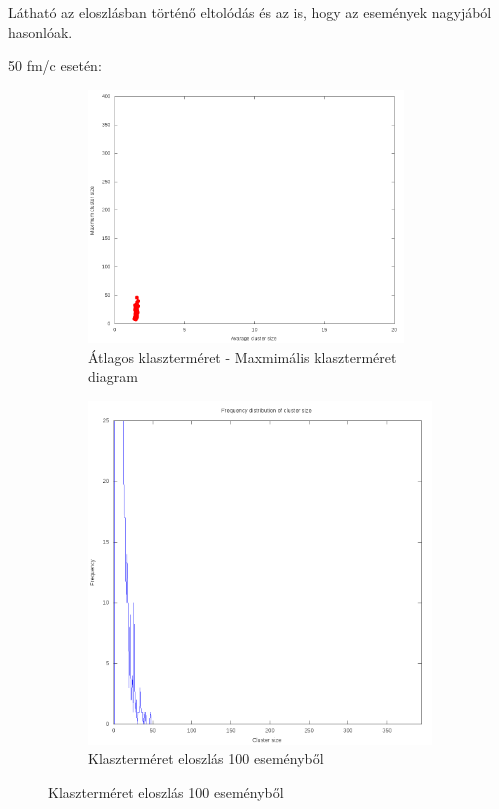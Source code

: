 \documentclass[a4paper,12pt]{article}
\begin{document}
\par Látható az eloszlásban történő eltolódás és az is, hogy az események nagyjából hasonlóak. 
\par 50 fm/c esetén:
\begin{figure}[H]
	\centering
	\begin{subfigure}{.49\textwidth}
		\includegraphics[width=0.92\textwidth]{mean-max9_100.png}
		\caption{ Átlagos klaszterméret - Maxmimális klaszterméret diagram }
	\end{subfigure}
	\begin{subfigure}{.49\textwidth}
		\includegraphics[width=.92\textwidth]{distribution_zoomed_9_100.png}
		\caption{ Klaszterméret eloszlás 100 eseményből } 
	\end{subfigure}
\end{figure}
\end{document}
